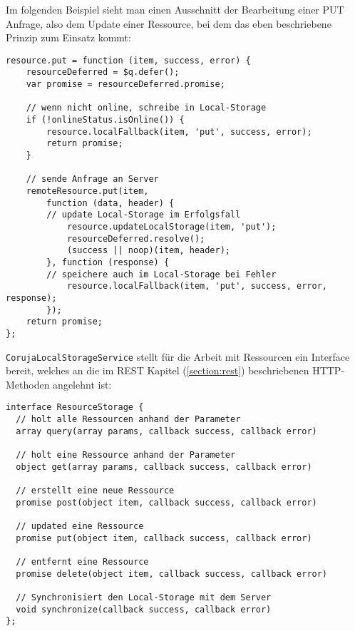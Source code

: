 Im folgenden Beispiel sieht man einen Ausschnitt der Bearbeitung einer PUT Anfrage, also dem Update einer Ressource, bei dem das eben beschriebene Prinzip zum Einsatz kommt:
\begin{lstlisting}
resource.put = function (item, success, error) {
    resourceDeferred = $q.defer();
    var promise = resourceDeferred.promise;

    // wenn nicht online, schreibe in Local-Storage
    if (!onlineStatus.isOnline()) {
        resource.localFallback(item, 'put', success, error);
        return promise;
    }

    // sende Anfrage an Server
    remoteResource.put(item,
        function (data, header) {
	    // update Local-Storage im Erfolgsfall
            resource.updateLocalStorage(item, 'put');
            resourceDeferred.resolve();
            (success || noop)(item, header);
        }, function (response) {
	    // speichere auch im Local-Storage bei Fehler
            resource.localFallback(item, 'put', success, error, response);
        });
    return promise;
}; 
\end{lstlisting}
\texttt{CorujaLocalStorageService} stellt für die Arbeit mit Ressourcen ein Interface bereit, welches an die im REST Kapitel (\ref{section:rest}) beschriebenen HTTP-Methoden angelehnt ist:
\begin{lstlisting}           
interface ResourceStorage {
  // holt alle Ressourcen anhand der Parameter
  array query(array params, callback success, callback error)
  
  // holt eine Ressource anhand der Parameter
  object get(array params, callback success, callback error) 
  
  // erstellt eine neue Ressource
  promise post(object item, callback success, callback error)
  
  // updated eine Ressource
  promise put(object item, callback success, callback error) 
  
  // entfernt eine Ressource
  promise delete(object item, callback success, callback error) 
  
  // Synchronisiert den Local-Storage mit dem Server
  void synchronize(callback success, callback error)
};             
\end{lstlisting}

